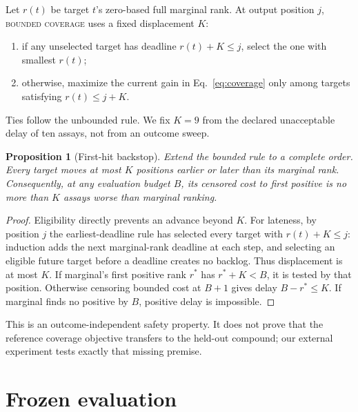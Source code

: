 \documentclass{article}
\newtheorem{proposition}{Proposition}
\begin{document}
Let $r(t)$ be target $t$'s zero-based full marginal rank. At output position
$j$, \textsc{bounded coverage} uses a fixed displacement $K$:
\begin{enumerate}
\item if any unselected target has deadline $r(t)+K\le j$, select the one
with smallest $r(t)$;
\item otherwise, maximize the current gain in Eq.~\ref{eq:coverage} only among
targets satisfying $r(t)\le j+K$.
\end{enumerate}
Ties follow the unbounded rule. We fix $K=9$ from the declared unacceptable
delay of ten assays, not from an outcome sweep.

\begin{proposition}[First-hit backstop]
Extend the bounded rule to a complete order. Every target moves at most $K$
positions earlier or later than its marginal rank. Consequently, at any
evaluation budget $B$, its censored cost to first positive is no more than
$K$ assays worse than marginal ranking.
\end{proposition}
\begin{proof}
Eligibility directly prevents an advance beyond $K$. For lateness, by
position $j$ the earliest-deadline rule has selected every target with
$r(t)+K\le j$: induction adds the next marginal-rank deadline at each step, and
selecting an eligible future target before a deadline creates no backlog.
Thus displacement is at most $K$. If marginal's first positive rank $r^*$ has
$r^*+K<B$, it is tested by that position. Otherwise censoring bounded cost at
$B+1$ gives delay $B-r^*\le K$. If marginal finds no positive by $B$, positive
delay is impossible.\qedhere
\end{proof}

This is an outcome-independent safety property. It does not prove that the
reference coverage objective transfers to the held-out compound; our external
experiment tests exactly that missing premise.

\section{Frozen evaluation}
\end{document}
